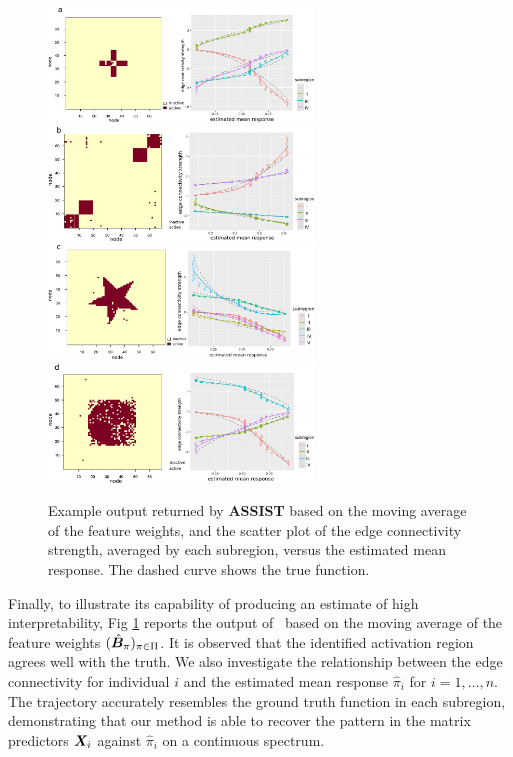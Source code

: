 \documentclass[aos]{imsart}
\theoremstyle{definition}
\def\NonparaM{\text{\bf \footnotesize ASSIST}}
\begin{document}
\begin{figure}[t!]
\centering
\includegraphics[width=7.05cm]{figure/est_cross.pdf} 
\includegraphics[width=7.05cm]{figure/est_block.pdf}
\includegraphics[width=7.05cm]{figure/est_star.pdf}
\includegraphics[width=7.05cm]{figure/est_circle.pdf}
\caption{Example output returned by {\bf \scriptsize ASSIST} based on the moving average of the feature weights, and the scatter plot of the edge connectivity strength, averaged by each subregion, versus the estimated mean response. The dashed curve shows the true function. }
\label{fig:compare2}
\end{figure}

Finally, to illustrate its capability of producing an estimate of high interpretability, Fig \ref{fig:compare2} reports the output of \NonparaM\ based on the moving average of the feature weights $(\hat {\bm B}_\pi)_{\pi\in\Pi}$. It is observed that the identified activation region agrees well with the truth. We also investigate the relationship between the edge connectivity for individual $i$ and the estimated mean response $\hat \pi_i$ for $i=1,\ldots,n$. The trajectory accurately resembles the ground truth function in each subregion, demonstrating that our method is able to recover the pattern in the matrix predictors $\bm X_i$ against $\hat \pi_i$ on a continuous spectrum.
\end{document}
